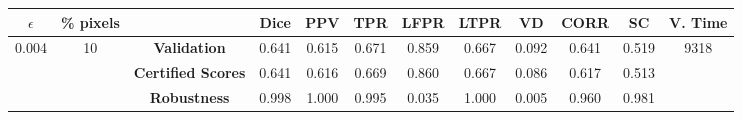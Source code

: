 \begin{longtable}{ c  c | c | c  c  c  c  c  c  c c c}
\toprule \textbf{$\epsilon$} & \textbf{\% pixels} & & \textbf{Dice} & \textbf{PPV} & \textbf{TPR} & \textbf{LFPR} & \textbf{LTPR} & \textbf{VD} & \textbf{CORR} & \textbf{SC} & \textbf{V. Time} \\
\midrule 
\multirow{3}{*}{0.004}  & \multirow{3}{*}{10} &\textbf{Validation} & 0.641 & 0.615 & 0.671 & 0.859 & 0.667 & 0.092 & 0.641 & 0.519 & \multirow{3}{*}{9318} \\
 & & \textbf{Certified Scores} & 0.641 & 0.616 & 0.669 & 0.860 & 0.667 & 0.086 & 0.617 & 0.513 & \\
& & \textbf{Robustness} & 0.998 & 1.000 & 0.995 & 0.035 & 1.000 & 0.005 & 0.960 & 0.981 & \\
\end{longtable}